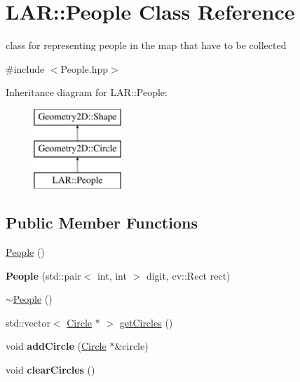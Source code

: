 \hypertarget{class_l_a_r_1_1_people}{}\section{L\+AR\+:\+:People Class Reference}
\label{class_l_a_r_1_1_people}


class for representing people in the map that have to be collected  




{\ttfamily \#include $<$People.\+hpp$>$}

Inheritance diagram for L\+AR\+:\+:People\+:\begin{figure}[H]
\begin{center}
\leavevmode
\includegraphics[height=3.000000cm]{class_l_a_r_1_1_people}
\end{center}
\end{figure}
\subsection*{Public Member Functions}
\begin{DoxyCompactItemize}
\item 
\mbox{\hyperlink{class_l_a_r_1_1_people_a87e2350faa20d4ac7298123f19b73953}{People}} ()
\item 
\mbox{\label{class_l_a_r_1_1_people_ac084ff2a18f915084612514bbd1e3ca6}} 
{\bfseries People} (std\+::pair$<$ int, int $>$ digit, cv\+::\+Rect rect)
\item 
\mbox{\hyperlink{class_l_a_r_1_1_people_a8a5dde9291e7d0aa0419971ed5b421e3}{$\sim$\+People}} ()
\item 
std\+::vector$<$ \mbox{\hyperlink{class_geometry2_d_1_1_circle}{Circle}} $\ast$ $>$ \mbox{\hyperlink{class_l_a_r_1_1_people_a7b1aca80884524498197a57dc704e516}{get\+Circles}} ()
\item 
\mbox{\label{class_l_a_r_1_1_people_a35953fba4aeb0780ea55eb1cce336423}} 
void {\bfseries add\+Circle} (\mbox{\hyperlink{class_geometry2_d_1_1_circle}{Circle}} $\ast$\&circle)
\item 
\mbox{\label{class_l_a_r_1_1_people_a4f50f2b15a657bf06082f5019d7b1735}} 
void {\bfseries clear\+Circles} ()
\end{DoxyCompactItemize}
